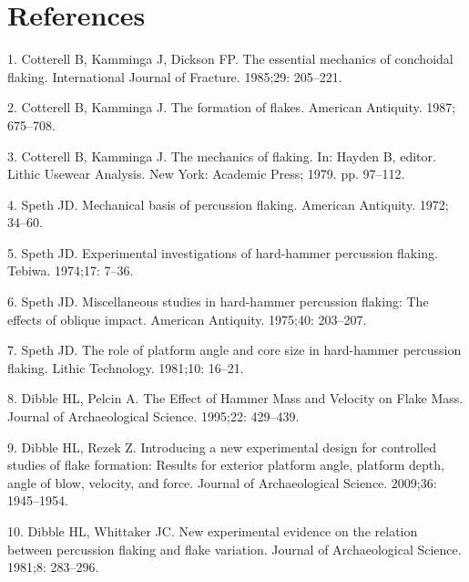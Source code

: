 \documentclass[10pt,letterpaper]{article}
\newenvironment{cslreferences}%
  {}%
  {\par}
\begin{document}
\hypertarget{references}{%
\section*{References}\label{references}}

\hypertarget{refs}{}
\begin{cslreferences}
\leavevmode\hypertarget{ref-cotterell_essential_1985}{}%
1. Cotterell B, Kamminga J, Dickson FP. The essential mechanics of
conchoidal flaking. International Journal of Fracture. 1985;29:
205--221.

\leavevmode\hypertarget{ref-cotterell_formation_1987}{}%
2. Cotterell B, Kamminga J. The formation of flakes. American Antiquity.
1987; 675--708.

\leavevmode\hypertarget{ref-cotterell_mechanics_1979}{}%
3. Cotterell B, Kamminga J. The mechanics of flaking. In: Hayden B,
editor. Lithic Usewear Analysis. New York: Academic Press; 1979. pp.
97--112.

\leavevmode\hypertarget{ref-speth_mechanical_1972}{}%
4. Speth JD. Mechanical basis of percussion flaking. American Antiquity.
1972; 34--60.

\leavevmode\hypertarget{ref-speth_experimental_1974}{}%
5. Speth JD. Experimental investigations of hard-hammer percussion
flaking. Tebiwa. 1974;17: 7--36.

\leavevmode\hypertarget{ref-speth_miscellaneous_1975}{}%
6. Speth JD. Miscellaneous studies in hard-hammer percussion flaking:
The effects of oblique impact. American Antiquity. 1975;40: 203--207.

\leavevmode\hypertarget{ref-speth_role_1981}{}%
7. Speth JD. The role of platform angle and core size in hard-hammer
percussion flaking. Lithic Technology. 1981;10: 16--21.

\leavevmode\hypertarget{ref-dibble_effect_1995}{}%
8. Dibble HL, Pelcin A. The Effect of Hammer Mass and Velocity on Flake
Mass. Journal of Archaeological Science. 1995;22: 429--439.

\leavevmode\hypertarget{ref-dibble_introducing_2009-1}{}%
9. Dibble HL, Rezek Z. Introducing a new experimental design for
controlled studies of flake formation: Results for exterior platform
angle, platform depth, angle of blow, velocity, and force. Journal of
Archaeological Science. 2009;36: 1945--1954.

\leavevmode\hypertarget{ref-dibble_new_1981-1}{}%
10. Dibble HL, Whittaker JC. New experimental evidence on the relation
between percussion flaking and flake variation. Journal of
Archaeological Science. 1981;8: 283--296.


\end{cslreferences}
\end{document}
